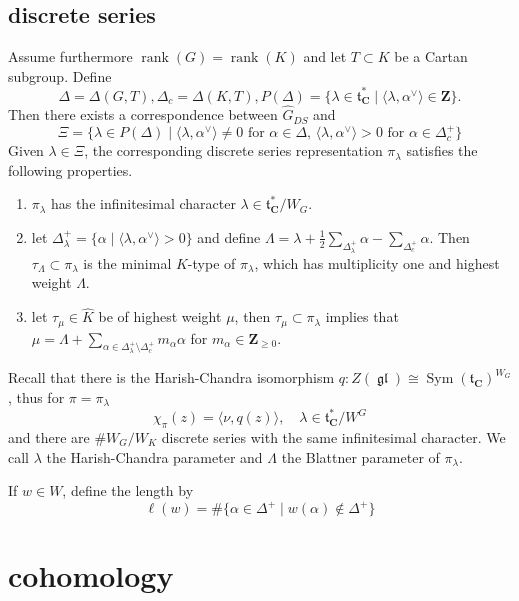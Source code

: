 \documentclass[leqno]{amsart}
\DeclareMathOperator{\gl}{\mathfrak{gl}}
\newcommand{\Z}{{\mathbf{Z}}}
\newcommand{\C}{\mathbf C}
\newcommand{\1}{\mathbf{1}}
\DeclareMathOperator{\rank}{rank}
\DeclareMathOperator{\Sym}{Sym}
\theoremstyle{definition}
\theoremstyle{remark}
\begin{document}
\subsection{discrete series}

Assume furthermore $\rank(G)=\rank(K)$
and let $T\subset K$ be a Cartan subgroup.
Define
\[
    \Delta=\Delta(G,T),
    \Delta_c=\Delta(K,T),
    P(\Delta)=
    \{\lambda\in \mathfrak{t}_\C^*\mid \langle \lambda,\alpha^\vee\rangle\in \Z\}.
\]
Then there exists a correspondence between $\hat{G}_{DS}$ and
\[
    \Xi=\{\lambda\in P(\Delta)\mid
    \langle \lambda, \alpha^\vee\rangle\neq 0 \text{ for }
    \alpha\in \Delta,\,
    \langle \lambda, \alpha^\vee\rangle>0 \text{ for }
    \alpha\in \Delta_c^+\}
\]
Given $\lambda\in\Xi$, the corresponding discrete series representation 
$\pi_\lambda$ satisfies the following properties.
\begin{enumerate}
    \item $\pi_\lambda$ has
    the infinitesimal character 
    $\lambda\in \mathfrak{t}_\C^*/W_G$.
    \item let $\Delta_\lambda^+=\{\alpha\mid \langle\lambda,\alpha^\vee\rangle>0\}$
    and define 
    $\Lambda=\lambda+\frac{1}{2}\sum_{\Delta_\lambda^+}\alpha-\sum_{\Delta_c^+}\alpha$.
    Then $\tau_\Lambda\subset \pi_\lambda$
    is the minimal $K$-type of $\pi_\lambda$,
    which has multiplicity one and highest weight $\Lambda$.
    \item let $\tau_\mu\in \hat{K}$ be of highest weight $\mu$,
    then $\tau_\mu\subset \pi_\lambda$ implies that
    $\mu=\Lambda+\sum_{\alpha\in \Delta_\lambda^+\setminus \Delta_c^+} m_\alpha\alpha$
    for $m_\alpha\in \Z_{\geq 0}$.
\end{enumerate}
Recall that there is the Harish-Chandra isomorphism
$q\colon Z(\gl)\cong \Sym(\mathfrak{t}_\C)^{W_G}$, thus for $\pi=\pi_\lambda$
\[
    \chi_\pi(z)=\langle \nu, q(z)\rangle,\quad
    \lambda\in \mathfrak{t}_\C^*/W^G
\]
and there are $\#W_G/W_K$ discrete series with the same infinitesimal character.
We call $\lambda$ the Harish-Chandra parameter and
$\Lambda$ the Blattner parameter of $\pi_\lambda$.

	If $w\in W$, define the length by
		 \[
			 \ell(w)=\#\{\alpha\in \Delta^+\mid
			 w(\alpha)\notin\Delta^+\}
		\]


\section{cohomology}
\end{document}
